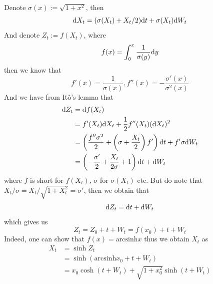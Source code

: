 \documentclass{homework}
\newcommand{\arcsinh}{\mathrm{arcsinh}}
\begin{document}
    \problem
    \begin{subproblem}
        \item

        \item
        Denote
        $\sigma(x):=\sqrt{1+x^2}$, then
        \[\mathrm d X_t=(\sigma(X_t)+X_t/2)\mathrm d t+\sigma(X_t)\mathrm d W_t\]
        And denote $Z_t:=f(X_t)$, where
        \[f(x)=\int_0^x\frac{1}{\sigma(y)}\mathrm d y\]
        then we know that
        \[f'(x)=\frac{1}{\sigma(x)},f''(x)=-\frac{\sigma'(x)}{\sigma^2(x)}\]
        And we have from It\^o's lemma that
        \[\begin{aligned}
            \mathrm d Z_t&=\mathrm d f(X_t)\\
            &=f'(X_t)\mathrm d X_t+\frac{1}{2}f''(X_t)(\mathrm d X_t)^2\\
            &=\left(\frac{f''\sigma^2}{2}
            +\left(\sigma+\frac{X_t}{2}\right)f'\right)\mathrm d t
            +f'\sigma\mathrm d W_t\\
            &=\left(-\frac{\sigma'}{2}+\frac{X_t}{2\sigma}+1\right)\mathrm d t+\mathrm d W_t
        \end{aligned}\]
        where $f$ is short for $f(X_t)$, $\sigma$ for $\sigma(X_t)$ etc.
        But do note that $X_t/\sigma=X_t/\sqrt{1+X_t^2}=\sigma'$, then
        we obtain that
        \[\mathrm d Z_t=\mathrm d t+\mathrm d W_t\]
        which gives us
        \[Z_t=Z_0+t+W_t=f(x_0)+t+W_t\]
        Indeed, one can show that $f(x)=\arcsinh x$
        thus we obtain $X_t$ as
        \[\begin{aligned}
            X_t&=\sinh Z_t\\
            &=\sinh(\arcsinh x_0+t+W_t)\\
            &=x_0\cosh(t+W_t)+\sqrt{1+x_0^2}\sinh(t+W_t)
        \end{aligned}\]
    \end{subproblem}
    
\end{document}
